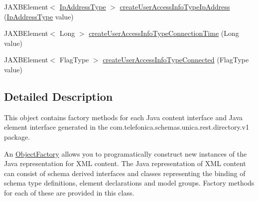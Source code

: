 \begin{DoxyCompactItemize}
\item 
JAXBElement$<$ \hyperlink{classcom_1_1telefonica_1_1schemas_1_1unica_1_1rest_1_1common_1_1v1_1_1IpAddressType}{IpAddressType} $>$ \hyperlink{classcom_1_1telefonica_1_1schemas_1_1unica_1_1rest_1_1directory_1_1v1_1_1ObjectFactory_a2da682855e09806d3ee975d05f4a12c7}{createUserAccessInfoTypeIpAddress} (\hyperlink{classcom_1_1telefonica_1_1schemas_1_1unica_1_1rest_1_1common_1_1v1_1_1IpAddressType}{IpAddressType} value)
\item 
JAXBElement$<$ Long $>$ \hyperlink{classcom_1_1telefonica_1_1schemas_1_1unica_1_1rest_1_1directory_1_1v1_1_1ObjectFactory_a6ab793fd523a2d14c800dd7c7e04300e}{createUserAccessInfoTypeConnectionTime} (Long value)
\item 
JAXBElement$<$ FlagType $>$ \hyperlink{classcom_1_1telefonica_1_1schemas_1_1unica_1_1rest_1_1directory_1_1v1_1_1ObjectFactory_ab8227c08495451eac8dbb20a6966a5ee}{createUserAccessInfoTypeConnected} (FlagType value)
\end{DoxyCompactItemize}


\subsection{Detailed Description}
This object contains factory methods for each Java content interface and Java element interface generated in the com.telefonica.schemas.unica.rest.directory.v1 package. 

An \hyperlink{classcom_1_1telefonica_1_1schemas_1_1unica_1_1rest_1_1directory_1_1v1_1_1ObjectFactory}{ObjectFactory} allows you to programatically construct new instances of the Java representation for XML content. The Java representation of XML content can consist of schema derived interfaces and classes representing the binding of schema type definitions, element declarations and model groups. Factory methods for each of these are provided in this class. 

